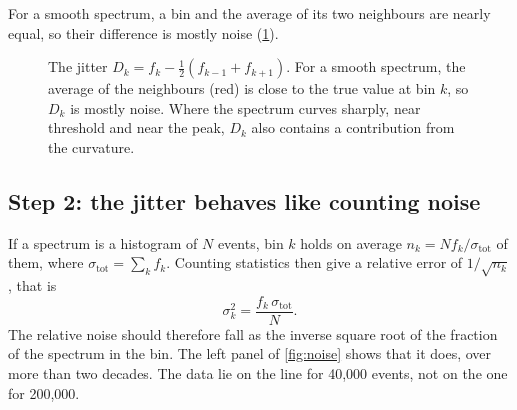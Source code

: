 \documentclass[11pt]{article}
\newcommand{\mhh}{m_{hh}}
\newcommand{\stot}{\sigma_\text{tot}}
\begin{document}
For a smooth spectrum, a bin and the average of its two neighbours are nearly equal,
so their difference is mostly noise (\cref{fig:jitter}).

\begin{figure}[h]
\centering
{}
\caption{The jitter $D_k = f_k - \tfrac12(f_{k-1} + f_{k+1})$. For a smooth spectrum,
the average of the neighbours (red) is close to the true value at bin $k$, so $D_k$ is
mostly noise. Where the spectrum curves sharply, near threshold and near the peak,
$D_k$ also contains a contribution from the curvature.}
\label{fig:jitter}
\end{figure}

\subsection{Step 2: the jitter behaves like counting noise}

If a spectrum is a histogram of $N$ events, bin $k$ holds on average
$n_k = N f_k / \stot$ of them, where $\stot = \sum_k f_k$. Counting statistics then give
a relative error of $1/\sqrt{n_k}$, that is
\[
  \sigma_k^2 = \frac{f_k\,\stot}{N} .
\]
The relative noise should therefore fall as the inverse square root of the fraction of
the spectrum in the bin. The left panel of \cref{fig:noise} shows that it does, over
more than two decades. The data lie on the line for 40,000 events, not on the one for
200,000.
\end{document}
